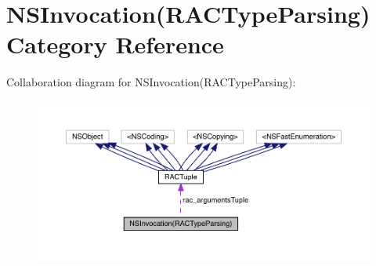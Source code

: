 \hypertarget{category_n_s_invocation_07_r_a_c_type_parsing_08}{}\section{N\+S\+Invocation(R\+A\+C\+Type\+Parsing) Category Reference}
\label{category_n_s_invocation_07_r_a_c_type_parsing_08}


Collaboration diagram for N\+S\+Invocation(R\+A\+C\+Type\+Parsing)\+:\nopagebreak
\begin{figure}[H]
\begin{center}
\leavevmode
\includegraphics[width=350pt]{category_n_s_invocation_07_r_a_c_type_parsing_08__coll__graph}
\end{center}
\end{figure}
